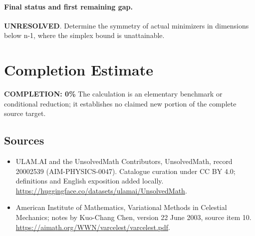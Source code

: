 \documentclass[11pt]{article}
\begin{document}
\paragraph{Final status and first remaining gap.}
\textbf{UNRESOLVED}. Determine the symmetry of actual minimizers in dimensions below n-1, where the simplex bound is unattainable.

\section{Completion Estimate}
\noindent\textbf{COMPLETION: 0\%}
The calculation is an elementary benchmark or conditional reduction; it establishes no claimed new portion of the complete source target.

\subsection{Sources}
\begin{itemize}
\item[\hypertarget{source:20002539:1}{S1}] ULAM.AI and the UnsolvedMath Contributors, UnsolvedMath, record 20002539 (AIM-PHYSICS-0047). Catalogue curation under CC BY 4.0; definitions and English exposition added locally.
\url{https://huggingface.co/datasets/ulamai/UnsolvedMath}.
\item[\hypertarget{source:20002539:2}{S2}] American Institute of Mathematics, Variational Methods in Celestial Mechanics; notes by Kuo-Chang Chen, version 22 June 2003, source item 10.
\url{https://aimath.org/WWN/varcelest/varcelest.pdf}.
\end{itemize}
\label{end:20002539}
\end{document}
